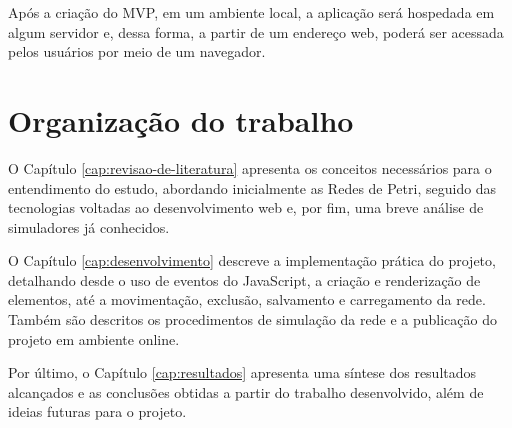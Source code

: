 \documentclass[
	12pt,				%
	openright,			%
	oneside,			%
	a4paper,			%
	english,			%
	brazil				%
	]{abntex2}
\theoremstyle{doispontos}
\begin{document}
Após a criação do MVP, em um ambiente local, a aplicação será hospedada em algum servidor e, dessa forma, a partir de um endereço web, poderá ser acessada pelos usuários por meio de um navegador. 

\section{Organização do trabalho}

O Capítulo \ref{cap:revisao-de-literatura} apresenta os conceitos necessários para o entendimento do estudo, abordando inicialmente as Redes de Petri, seguido das tecnologias voltadas ao desenvolvimento web e, por fim, uma breve análise de simuladores já conhecidos.

O Capítulo \ref{cap:desenvolvimento} descreve a implementação prática do projeto, detalhando desde o uso de eventos do JavaScript, a criação e renderização de elementos, até a movimentação, exclusão, salvamento e carregamento da rede. Também são descritos os procedimentos de simulação da rede e a publicação do projeto em ambiente online.

Por último, o Capítulo \ref{cap:resultados} apresenta uma síntese dos resultados alcançados e as conclusões obtidas a partir do trabalho desenvolvido, além de ideias futuras para o projeto.








\end{document}

